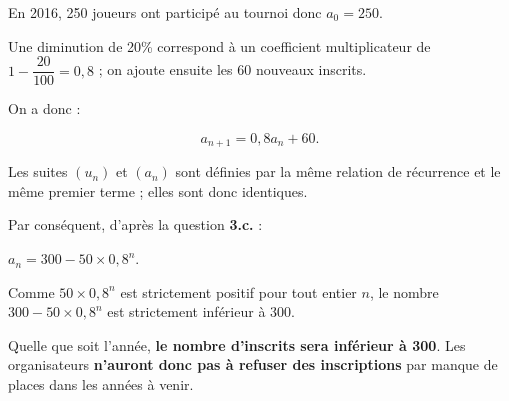 \begin{corrige}
\begin{enumerate}
          \par
          En 2016, 250 joueurs ont participé au tournoi donc $a_0=250$.
          \par
          Une diminution de 20\% correspond à un coefficient multiplicateur de ${1-\dfrac{20}{100}=0,8}$ ; on ajoute ensuite les 60 nouveaux inscrits.
          \par
          On a donc :
          \par
          \[ a_{n+1}=0,8a_n+60. \]
          \par
          Les suites $(u_n)$ et $(a_n)$ sont définies par la même relation de récurrence et le même premier terme ; elles sont donc identiques.
          \par
          Par conséquent, d'après la question \textbf{3.c.} :
          \par
          $a_{n}= 300 -50 \times 0,8^n$.
          \par
          Comme $50 \times 0,8^n$ est strictement positif pour tout entier $n$, le nombre $300 -50 \times 0,8^n$ est strictement inférieur à 300.
          \par
          Quelle que soit l'année, \textbf{le nombre d'inscrits sera inférieur à 300}. Les organisateurs \textbf{n'auront donc pas à refuser des inscriptions} par manque de places dans les années à venir.
     \end{enumerate}
\end{corrige}
